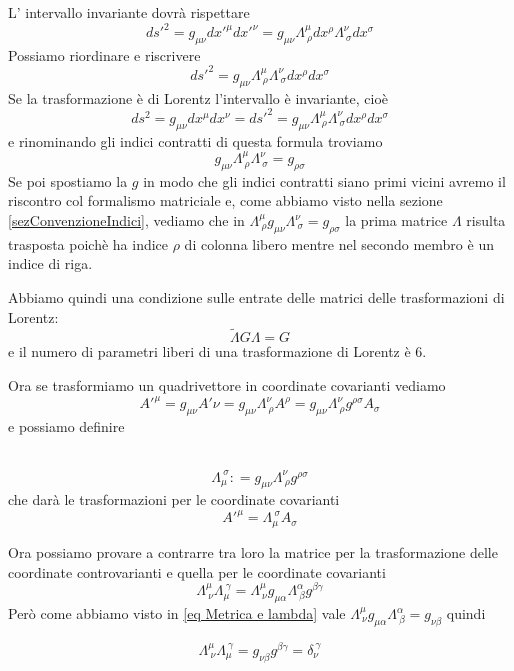 \documentclass[12pt,a4paper,titlepage, twoside, openright]{book}
\newenvironment{definizione}[1][\empty]{\begin{Definizione}{
\ifx\empty#1\relax\else\mdseries\itshape#1\\\fi
}{}}{\end{Definizione}}
\numberwithin{equation}{chapter}
\begin{document}
L' intervallo invariante dovrà rispettare
\[
ds'^2 = g_{\mu \nu } dx'^\mu dx'^\nu = g_{\mu\nu} \Lambda^\mu_{\> \rho} dx^\rho \Lambda^\nu_{\> \sigma} dx^\sigma
\]
Possiamo riordinare e riscrivere
\[
ds'^2= g_{\mu\nu} \Lambda^\mu_{\> \rho}  \Lambda^\nu_{\> \sigma} dx^\rho dx^\sigma
\]
Se la trasformazione è di Lorentz l'intervallo è invariante, cioè  
\[
ds^2=g_{\mu\nu}dx^\mu dx^\nu=ds'^2=g_{\mu\nu} \Lambda^\mu_{\> \rho}  \Lambda^\nu_{\> \sigma} dx^\rho dx^\sigma
\] e rinominando gli indici contratti di questa formula troviamo
\begin{equation}\label{eq Metrica e lambda}
g_{\mu\nu} \Lambda^\mu_{\> \rho}  \Lambda^\nu_{\> \sigma} = g_{\rho\sigma}
\end{equation}
Se poi spostiamo la $g$ in modo che gli indici contratti siano primi vicini avremo il riscontro col formalismo matriciale e, come abbiamo visto nella sezione \ref{sezConvenzioneIndici}, vediamo che in $\Lambda^\mu_{\> \rho} g_{\mu\nu}  \Lambda^\nu_{\> \sigma} = g_{\rho\sigma}$
la prima matrice $\Lambda$ risulta trasposta poichè ha indice $\rho$ di colonna libero mentre nel secondo membro è un indice di riga.
 
Abbiamo quindi una condizione sulle entrate delle matrici delle trasformazioni di Lorentz: 
\begin{equation}
\tilde{\Lambda}G\Lambda=G
\end{equation}
e il numero di parametri liberi di una trasformazione di Lorentz è 6.

Ora se trasformiamo un quadrivettore in coordinate covarianti vediamo
\[
A'^\mu=g_{\mu\nu}A'\nu=g_{\mu\nu}\Lambda^{\nu}_{\> \rho}A^\rho = g_{\mu\nu}\Lambda^{\nu}_{\> \rho} g^{\rho\sigma}A_\sigma
\]
e possiamo definire
\begin{definizione}
\[
\Lambda^{\> \sigma}_{\mu} \mathrel{\mathop:}= g_{\mu\nu}\Lambda^{\nu}_{\> \rho} g^{\rho\sigma}
\]
che darà le trasformazioni per le coordinate covarianti
\[
A'^\mu=\Lambda^{\> \sigma}_{\mu} A_\sigma
\]
\end{definizione}

Ora possiamo provare a contrarre tra loro la matrice per la trasformazione delle coordinate controvarianti e quella per le coordinate covarianti
\[
\Lambda^\mu_{\> \nu} \Lambda^{\> \gamma}_{\mu}= \Lambda^{\mu}_{\> \nu} g_{\mu\alpha} \Lambda^{\alpha}_{\> \beta} g^{\beta\gamma}
\]
Però come abbiamo visto in \eqref{eq Metrica e lambda} vale $\Lambda^{\mu}_{\> \nu} g_{\mu\alpha} \Lambda^{\alpha}_{\>\beta}=g_{\nu\beta}$ quindi

\begin{equation}
\Lambda^\mu_{\> \nu} \Lambda^{\> \gamma}_{\mu}= g_{\nu\beta}g^{\beta\gamma}=\delta^{\>\gamma}_{\nu}
\end{equation}
\end{document}
